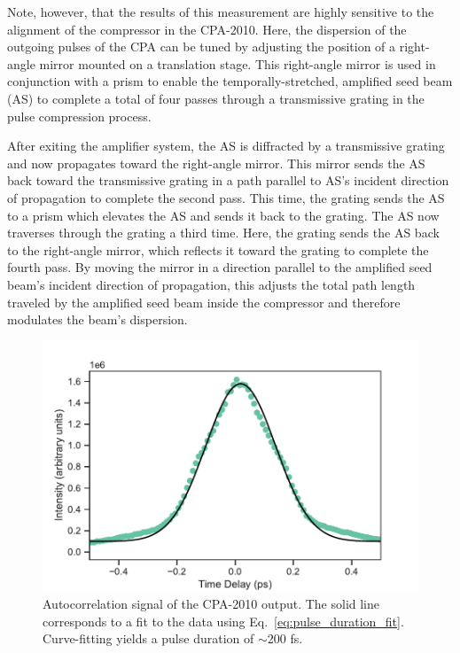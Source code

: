 Note, however, that the results of this measurement are highly sensitive to the alignment of the compressor in the CPA-2010. Here, the dispersion of the outgoing pulses of the CPA can be tuned by adjusting the position of a right-angle mirror mounted on a translation stage. This right-angle mirror is used in conjunction with a prism to enable the temporally-stretched, amplified seed beam (AS) to complete a total of four passes through a transmissive grating in the pulse compression process.

After exiting the amplifier system, the AS is diffracted by a transmissive grating and now propagates toward the right-angle mirror. This mirror sends the AS back toward the transmissive grating in a path parallel to AS's incident direction of propagation to complete the second pass. This time, the grating sends the AS to a prism which elevates the AS and sends it back to the grating. The AS now traverses through the grating a third time. Here, the grating sends the AS back to the right-angle mirror, which reflects it toward the grating to complete the fourth pass. By moving the mirror in a direction parallel to the amplified seed beam's incident direction of propagation, this adjusts the total path length traveled by the amplified seed beam inside the compressor and therefore modulates the beam's dispersion.


\begin{figure}[ht]
	\centering
	\includegraphics[scale=0.6]{images/chapter_methods/cpa_autocorr}
	\caption{Autocorrelation signal of the CPA-2010 output. The solid line corresponds to a fit to the data using Eq.\ \eqref{eq:pulse_duration_fit}. Curve-fitting yields a pulse duration of $\sim$200 fs.}
	\label{fig:cpa_autocorr}
\end{figure}

